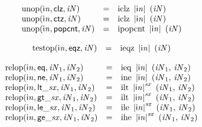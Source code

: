 $$
\begin{array}{@{}lcl@{}l@{}}
{\mathrm{unop}}({\mathsf{i}}{{\mathit{n}}}, \mathsf{clz}, {\mathit{iN}}) &=& {\mathrm{iclz}}~\,{|{\mathsf{i}}{{\mathit{n}}}|}~\,({\mathit{iN}}) &  \\
{\mathrm{unop}}({\mathsf{i}}{{\mathit{n}}}, \mathsf{ctz}, {\mathit{iN}}) &=& {\mathrm{iclz}}~\,{|{\mathsf{i}}{{\mathit{n}}}|}~\,({\mathit{iN}}) &  \\
{\mathrm{unop}}({\mathsf{i}}{{\mathit{n}}}, \mathsf{popcnt}, {\mathit{iN}}) &=& {\mathrm{ipopcnt}}~\,{|{\mathsf{i}}{{\mathit{n}}}|}~\,({\mathit{iN}}) &  \\
\end{array}
$$

$$
\begin{array}{@{}lcl@{}l@{}}
{\mathrm{testop}}({\mathsf{i}}{{\mathit{n}}}, \mathsf{eqz}, {\mathit{iN}}) &=& {\mathrm{ieqz}}~\,{|{\mathsf{i}}{{\mathit{n}}}|}~\,({\mathit{iN}}) &  \\
\end{array}
$$

$$
\begin{array}{@{}lcl@{}l@{}}
{\mathrm{relop}}({\mathsf{i}}{{\mathit{n}}}, \mathsf{eq}, {\mathit{iN}}_{{1}}, {\mathit{iN}}_{{2}}) &=& {\mathrm{ieq}}~\,{|{\mathsf{i}}{{\mathit{n}}}|}~\,({\mathit{iN}}_{{1}},\, {\mathit{iN}}_{{2}}) &  \\
{\mathrm{relop}}({\mathsf{i}}{{\mathit{n}}}, \mathsf{ne}, {\mathit{iN}}_{{1}}, {\mathit{iN}}_{{2}}) &=& {\mathrm{ine}}~\,{|{\mathsf{i}}{{\mathit{n}}}|}~\,({\mathit{iN}}_{{1}},\, {\mathit{iN}}_{{2}}) &  \\
{\mathrm{relop}}({\mathsf{i}}{{\mathit{n}}}, {\mathsf{lt\_}}{{\mathit{sx}}}, {\mathit{iN}}_{{1}}, {\mathit{iN}}_{{2}}) &=& {\mathrm{ilt}}~\,{{|{\mathsf{i}}{{\mathit{n}}}|}^{{\mathit{sx}}}}~\,({\mathit{iN}}_{{1}},\, {\mathit{iN}}_{{2}}) &  \\
{\mathrm{relop}}({\mathsf{i}}{{\mathit{n}}}, {\mathsf{gt\_}}{{\mathit{sx}}}, {\mathit{iN}}_{{1}}, {\mathit{iN}}_{{2}}) &=& {\mathrm{ilt}}~\,{{|{\mathsf{i}}{{\mathit{n}}}|}^{{\mathit{sx}}}}~\,({\mathit{iN}}_{{1}},\, {\mathit{iN}}_{{2}}) &  \\
{\mathrm{relop}}({\mathsf{i}}{{\mathit{n}}}, {\mathsf{le\_}}{{\mathit{sx}}}, {\mathit{iN}}_{{1}}, {\mathit{iN}}_{{2}}) &=& {\mathrm{ile}}~\,{{|{\mathsf{i}}{{\mathit{n}}}|}^{{\mathit{sx}}}}~\,({\mathit{iN}}_{{1}},\, {\mathit{iN}}_{{2}}) &  \\
{\mathrm{relop}}({\mathsf{i}}{{\mathit{n}}}, {\mathsf{ge\_}}{{\mathit{sx}}}, {\mathit{iN}}_{{1}}, {\mathit{iN}}_{{2}}) &=& {\mathrm{ihe}}~\,{{|{\mathsf{i}}{{\mathit{n}}}|}^{{\mathit{sx}}}}~\,({\mathit{iN}}_{{1}},\, {\mathit{iN}}_{{2}}) &  \\
\end{array}
$$

